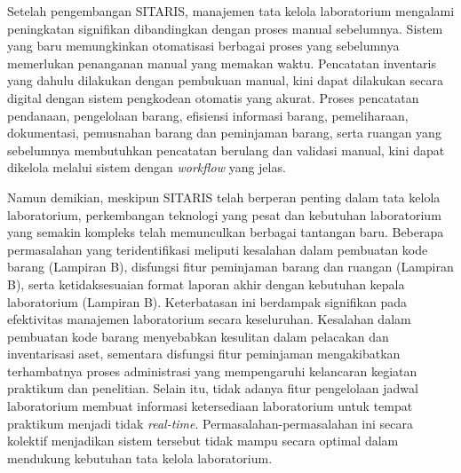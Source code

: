 Setelah pengembangan SITARIS, manajemen tata kelola laboratorium mengalami peningkatan signifikan dibandingkan dengan proses manual sebelumnya. Sistem yang baru memungkinkan otomatisasi berbagai proses yang sebelumnya memerlukan penanganan manual yang memakan waktu. Pencatatan inventaris yang dahulu dilakukan dengan pembukuan manual, kini dapat dilakukan secara digital dengan sistem pengkodean otomatis yang akurat. Proses pencatatan pendanaan, pengelolaan barang, efisiensi informasi barang, pemeliharaan, dokumentasi, pemusnahan barang dan peminjaman barang, serta ruangan yang sebelumnya membutuhkan pencatatan berulang dan validasi manual, kini dapat dikelola melalui sistem dengan \textit{workflow} yang jelas.

Namun demikian, meskipun SITARIS telah berperan penting dalam tata kelola laboratorium, perkembangan teknologi yang pesat dan kebutuhan laboratorium yang semakin kompleks telah memunculkan berbagai tantangan baru. Beberapa permasalahan yang teridentifikasi meliputi kesalahan dalam pembuatan kode barang (Lampiran B), disfungsi fitur peminjaman barang dan ruangan (Lampiran B), serta ketidaksesuaian format laporan akhir dengan kebutuhan kepala laboratorium (Lampiran B). Keterbatasan ini berdampak signifikan pada efektivitas manajemen laboratorium secara keseluruhan. Kesalahan dalam pembuatan kode barang menyebabkan kesulitan dalam pelacakan dan inventarisasi aset, sementara disfungsi fitur peminjaman mengakibatkan terhambatnya proses administrasi yang mempengaruhi kelancaran kegiatan praktikum dan penelitian. Selain itu, tidak adanya fitur pengelolaan jadwal laboratorium membuat informasi ketersediaan laboratorium untuk tempat praktikum menjadi tidak \textit{real-time}. Permasalahan-permasalahan ini secara kolektif menjadikan sistem tersebut tidak mampu secara optimal dalam mendukung kebutuhan tata kelola laboratorium.

